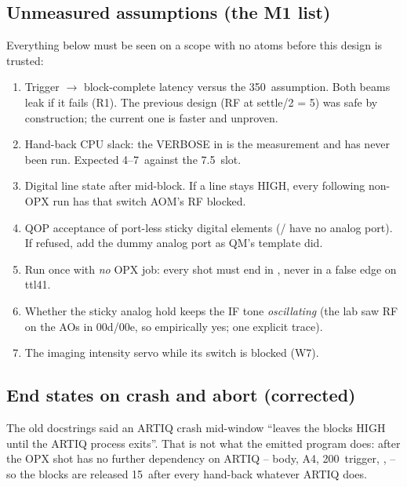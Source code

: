 \subsection{Unmeasured assumptions (the M1 list)}
\label{sec:handoff:m1}

Everything below must be seen on a scope with no atoms before this design
is trusted:

\begin{enumerate}[nosep]
  \item Trigger $\to$ block-complete latency versus the 350\nsu\ assumption.
    Both beams leak if it fails (R1). The previous design (RF at settle/2 =
    5\us) was safe by construction; the current one is faster and unproven.
  \item Hand-back CPU slack: the VERBOSE  in
     is the measurement and has
    never been run. Expected 4--7\us\ against the 7.5\us\ slot.
  \item Digital line state after  mid-block. If a line stays
    HIGH, every following non-OPX run has that switch AOM's RF blocked.
  \item QOP acceptance of port-less sticky digital elements
    (/ have no analog port). If
    refused, add the dummy analog port as QM's template did.
  \item Run once with \emph{no} OPX job: every shot must end in
    , never in a false edge on ttl41.
  \item Whether the sticky analog hold keeps the IF tone \emph{oscillating}
    (the lab saw RF on the AOs in 00d/00e, so empirically yes; one explicit
    trace).
  \item The imaging intensity servo while its switch is blocked (W7).
\end{enumerate}

\subsection{End states on crash and abort (corrected)}
\label{sec:handoff:crash}

The old docstrings said an ARTIQ crash mid-window ``leaves the blocks HIGH
until the ARTIQ process exits''. That is not what the emitted program does:
after  the OPX shot has no further dependency on
ARTIQ -- body, A4, 200\nsu\ trigger, ,  -- so the
blocks are released 15\us\ after every hand-back whatever ARTIQ does.

